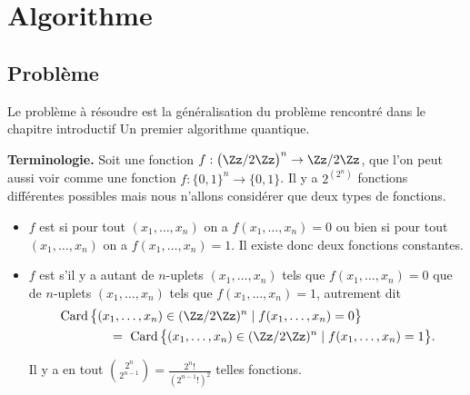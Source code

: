 \documentclass[11pt,class=report,crop=false]{standalone}
\begin{document}





\section{Algorithme}

\subsection{Problème}

Le problème à résoudre est la généralisation du problème rencontré dans le chapitre introductif \og{}Un premier algorithme quantique\fg{}.

\textbf{Terminologie.}
Soit une fonction $f : \big(\Zz/2\Zz\big)^n \to \Zz/2\Zz$, que l'on peut aussi voir comme une fonction $f : \{0,1\}^n \to \{0,1\}$. Il y a $2^{(2^n)}$ fonctions différentes possibles mais nous n'allons considérer que deux types de fonctions.
\begin{itemize}
  \item $f$ est  si pour tout $(x_1,\ldots,x_n)$ on a $f(x_1,\ldots,x_n)=0$
ou bien si pour tout $(x_1,\ldots,x_n)$ on a $f(x_1,\ldots,x_n)=1$. 
Il existe donc deux fonctions constantes.

  \item $f$ est  s'il y a autant de $n$-uplets $(x_1,\ldots,x_n)$ tels que $f(x_1,\ldots,x_n)=0$ que de $n$-uplets $(x_1,\ldots,x_n)$ tels que $f(x_1,\ldots,x_n)=1$, autrement dit 
\begin{align*}
&\operatorname{Card}\big\{ (x_1,\ldots,x_n) \in (\Zz/2\Zz)^n \mid f(x_1,\ldots,x_n)=0 \big\} \\
&\qquad\qquad= \ \operatorname{Card}\big\{ (x_1,\ldots,x_n) \in (\Zz/2\Zz)^n \mid f(x_1,\ldots,x_n)=1 \big\}.
\end{align*}

Il y a en tout $\binom{2^n}{2^{n-1}} = \frac{2^n!}{(2^{n-1}!)^2}$ telles fonctions. 

\end{itemize}
\end{document}
